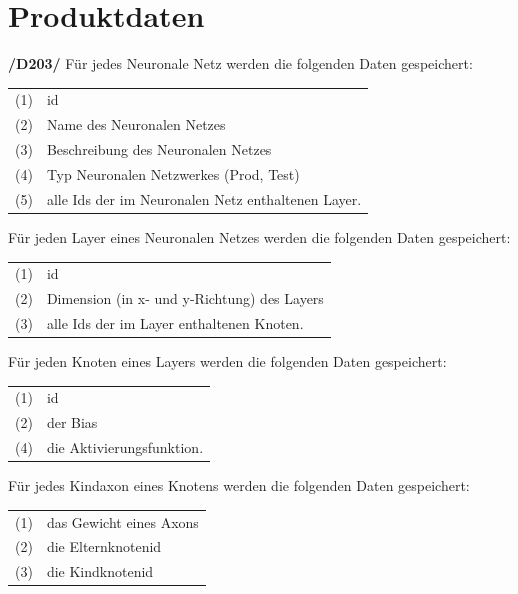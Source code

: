 \chapter{Produktdaten}

\textbf{/D203/} Für jedes Neuronale Netz werden die folgenden Daten gespeichert: 

\begin{tabular}{cl}
(1) & id \\[0.2cm]
(2) & Name des Neuronalen Netzes\\[0.2cm]
(3) & Beschreibung des Neuronalen Netzes\\[0.2cm]
(4) & Typ Neuronalen Netzwerkes (Prod, Test)\\[0.2cm]
(5) & alle Ids der im Neuronalen Netz enthaltenen Layer.  
\end{tabular}

Für jeden Layer eines Neuronalen Netzes werden die folgenden Daten gespeichert: 

\begin{tabular}{cl}
(1) & id \\[0.2cm]
(2) & Dimension (in x- und y-Richtung) des Layers \\[0.2cm]
(3) & alle Ids der im Layer enthaltenen Knoten.
\end{tabular}

Für jeden Knoten eines Layers werden die folgenden Daten gespeichert: 

\begin{tabular}{cl}
(1) & id \\[0.2cm]
(2) & der Bias \\[0.2cm]
(4) & die Aktivierungsfunktion.
\end{tabular}

Für jedes Kindaxon eines Knotens werden die folgenden Daten gespeichert: 

\begin{tabular}{cl}
(1) & das Gewicht eines Axons \\[0.2cm]
(2) & die Elternknotenid \\[0.2cm]
(3) & die Kindknotenid \\[0.2cm]
\end{tabular}


